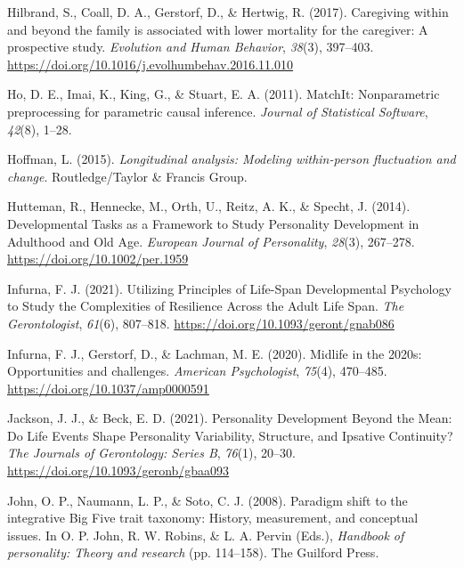 \documentclass[
  english,
  man, noextraspace]{apa7}
\begin{document}
\leavevmode\hypertarget{ref-hilbrandCaregivingFamilyAssociated2017}{}%
Hilbrand, S., Coall, D. A., Gerstorf, D., \& Hertwig, R. (2017). Caregiving within and beyond the family is associated with lower mortality for the caregiver: A prospective study. \emph{Evolution and Human Behavior}, \emph{38}(3), 397--403. \url{https://doi.org/10.1016/j.evolhumbehav.2016.11.010}

\leavevmode\hypertarget{ref-MatchIt2011}{}%
Ho, D. E., Imai, K., King, G., \& Stuart, E. A. (2011). MatchIt: Nonparametric preprocessing for parametric causal inference. \emph{Journal of Statistical Software}, \emph{42}(8), 1--28.

\leavevmode\hypertarget{ref-hoffmanLongitudinalAnalysisModeling2015}{}%
Hoffman, L. (2015). \emph{Longitudinal analysis: Modeling within-person fluctuation and change}. Routledge/Taylor \& Francis Group.

\leavevmode\hypertarget{ref-huttemanDevelopmentalTasksFramework2014}{}%
Hutteman, R., Hennecke, M., Orth, U., Reitz, A. K., \& Specht, J. (2014). Developmental Tasks as a Framework to Study Personality Development in Adulthood and Old Age. \emph{European Journal of Personality}, \emph{28}(3), 267--278. \url{https://doi.org/10.1002/per.1959}

\leavevmode\hypertarget{ref-infurnaUtilizingPrinciplesLifeSpan2021}{}%
Infurna, F. J. (2021). Utilizing Principles of Life-Span Developmental Psychology to Study the Complexities of Resilience Across the Adult Life Span. \emph{The Gerontologist}, \emph{61}(6), 807--818. \url{https://doi.org/10.1093/geront/gnab086}

\leavevmode\hypertarget{ref-infurnaMidlife2020sOpportunities2020}{}%
Infurna, F. J., Gerstorf, D., \& Lachman, M. E. (2020). Midlife in the 2020s: Opportunities and challenges. \emph{American Psychologist}, \emph{75}(4), 470--485. \url{https://doi.org/10.1037/amp0000591}

\leavevmode\hypertarget{ref-jacksonPersonalityDevelopmentMean2021}{}%
Jackson, J. J., \& Beck, E. D. (2021). Personality Development Beyond the Mean: Do Life Events Shape Personality Variability, Structure, and Ipsative Continuity? \emph{The Journals of Gerontology: Series B}, \emph{76}(1), 20--30. \url{https://doi.org/10.1093/geronb/gbaa093}

\leavevmode\hypertarget{ref-johnParadigmShiftIntegrative2008}{}%
John, O. P., Naumann, L. P., \& Soto, C. J. (2008). Paradigm shift to the integrative Big Five trait taxonomy: History, measurement, and conceptual issues. In O. P. John, R. W. Robins, \& L. A. Pervin (Eds.), \emph{Handbook of personality: Theory and research} (pp. 114--158). The Guilford Press.
\end{document}

